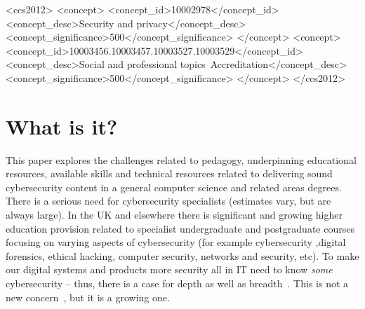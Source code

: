 \documentclass[sigconf]{acmart}
\begin{document}
\begin{CCSXML}
<ccs2012>
<concept>
<concept_id>10002978</concept_id>
<concept_desc>Security and privacy</concept_desc>
<concept_significance>500</concept_significance>
</concept>
<concept>
<concept_id>10003456.10003457.10003527.10003529</concept_id>
<concept_desc>Social and professional topics~Accreditation</concept_desc>
<concept_significance>500</concept_significance>
</concept>
</ccs2012>
\end{CCSXML}





\maketitle


\section {What is it?}

This paper explores the challenges related to pedagogy, underpinning educational resources, available skills and technical resources related to delivering sound cybersecurity content in a general computer science and related areas degrees. There is a serious need for cybersecurity specialists (estimates vary, but are always large). In the UK and elsewhere there is significant and growing higher education provision related to specialist undergraduate and postgraduate courses focusing on varying aspects of cybersecurity (for example cybersecurity ,digital forensics, ethical hacking, computer security, networks and security, etc).    To make our digital systems and products more security all in IT need to know \emph{some} cybersecurity -- thus, there is a case for depth as well as breadth~\cite{manson+pike:2014,davenport-et-al:latice2016}. This is not a new concern~\cite{Parr2014a}, but it is a growing one.
\end{document}
